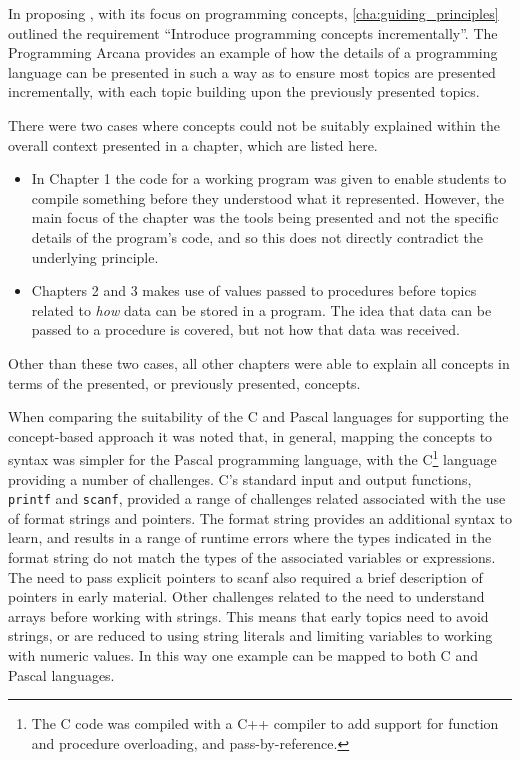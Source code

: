 In proposing , with its focus on programming concepts, \cref{cha:guiding_principles} outlined the requirement ``Introduce programming concepts incrementally''. The Programming Arcana provides an example of how the details of a programming language can be presented in such a way as to ensure most topics are presented incrementally, with each topic building upon the previously presented topics. 

There were two cases where concepts could not be suitably explained within the overall context presented in a chapter, which are listed here.

\begin{itemize}[noitemsep,nolistsep]
  \item In Chapter 1 the code for a working program was given to enable students to compile something before they understood what it represented. However, the main focus of the chapter was the tools being presented and not the specific details of the program's code, and so this does not directly contradict the underlying principle. 
  \item Chapters 2 and 3 makes use of values passed to procedures before topics related to \emph{how} data can be stored in a program. The idea that data can be passed to a procedure is covered, but not how that data was received.
\end{itemize}

Other than these two cases, all other chapters were able to explain all concepts in terms of the presented, or previously presented, concepts.


When comparing the suitability of the C and Pascal languages for supporting the concept-based approach it was noted that, in general, mapping the concepts to syntax was simpler for the Pascal programming language, with the C\footnote{The C code was compiled with a C++ compiler to add support for function and procedure overloading, and pass-by-reference.} language providing a number of challenges. C's standard input and output functions, \texttt{printf} and \texttt{scanf}, provided a range of challenges related associated with the use of format strings and pointers. The format string provides an additional syntax to learn, and results in a range of runtime errors where the types indicated in the format string do not match the types of the associated variables or expressions. The need to pass explicit pointers to scanf also required a brief description of pointers in early material. Other challenges related to the need to understand arrays before working with strings. This means that early topics need to avoid strings, or are reduced to using string literals and limiting variables to working with numeric values. In this way one example can be mapped to both C and Pascal languages. 

